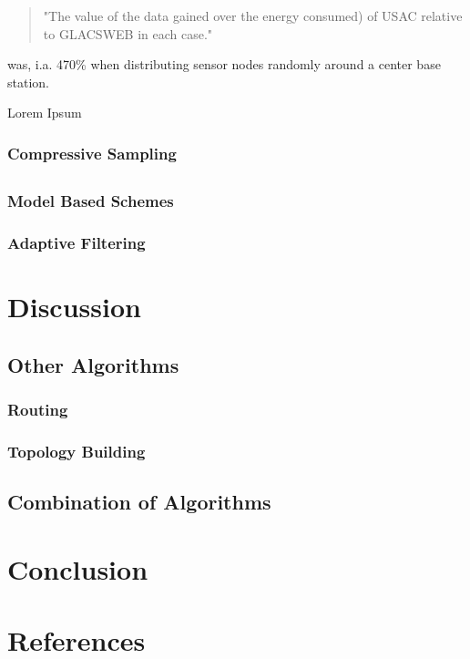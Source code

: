 \begin{quotation}
    "The value of the data gained over the energy consumed) of USAC relative to
    GLACSWEB in each case."
\end{quotation}

was, i.a. 470\% when distributing sensor nodes randomly around a center base station.
\par

Lorem Ipsum 
\subsubsection{Compressive Sampling}
\label{sec:Compressive Sampling}


\subsection{\catII}
\label{sec:catII}

\subsubsection{Model Based Schemes}
\label{sec:Model Based Schemes}


\subsubsection{Adaptive Filtering}
\label{sec:Adaptive Filtering}

\subsection{\catIII}
\label{sec:catIII}


\section{Discussion}
\label{sec:Discussion}


\subsection{Other Algorithms}
\label{sec:Listings}

\subsubsection{Routing}
\label{sec:Listings}

\subsubsection{Topology Building}
\label{sec:Listings}


\subsection{Combination of Algorithms}
\label{sec:Listings}


\section{Conclusion}
\label{sec:Conclusion}


\section{References}
\label{sec:References}

